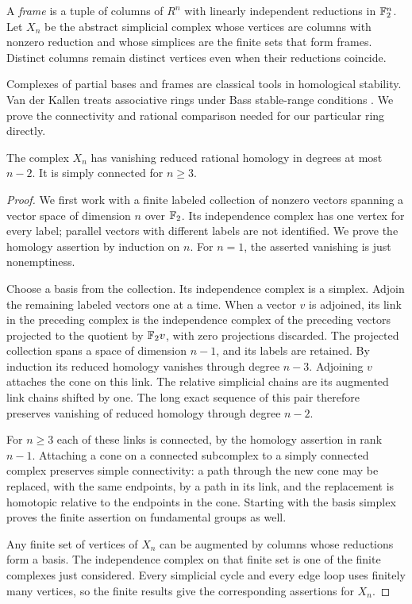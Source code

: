A \emph{frame} is a tuple of columns of $R^n$ with linearly independent
reductions in $\mathbb F_2^n$. Let $X_n$ be the abstract simplicial complex whose
vertices are columns with nonzero reduction and whose simplices are the
finite sets that form frames. Distinct columns remain distinct vertices
even when their reductions coincide.

Complexes of partial bases and frames are classical tools in
homological stability. Van der Kallen treats associative rings under
Bass stable-range conditions \cite{vanderKallen1980Homology}. We prove
the connectivity and rational comparison needed for our particular
ring directly.

\begin{lemma}\label{st:frames}
The complex $X_n$ has vanishing reduced rational homology in degrees at
most $n-2$. It is simply connected for $n\geq3$.
\end{lemma}

\begin{proof}
We first work with a finite labeled collection of nonzero vectors
spanning a vector space of dimension $n$ over $\mathbb F_2$. Its independence
complex has one vertex for every label; parallel vectors with different
labels are not identified. We prove the homology assertion by induction
on $n$. For $n=1$, the asserted vanishing is just nonemptiness.

Choose a basis from the collection. Its independence complex is a
simplex. Adjoin the remaining labeled vectors one at a time. When a
vector $v$ is adjoined, its link in the preceding complex is the
independence complex of the preceding vectors projected to the quotient
by $\mathbb F_2v$, with zero projections discarded. The projected collection
spans a space of dimension $n-1$, and its labels are retained.
By induction its reduced homology vanishes through degree $n-3$.
Adjoining $v$ attaches the cone on this link. The relative simplicial
chains are its augmented link chains shifted by one. The long exact
sequence of this pair therefore preserves vanishing of reduced homology
through degree $n-2$.

For $n\geq3$ each of these links is connected, by the homology assertion
in rank $n-1$. Attaching a cone on a connected subcomplex to a simply
connected complex preserves simple connectivity: a path through the
new cone may be replaced, with the same endpoints, by a path in its
link, and the replacement is homotopic relative to the endpoints in
the cone. Starting with the basis simplex proves the finite assertion
on fundamental groups as well.

Any finite set of vertices of $X_n$ can be augmented by columns whose
reductions form a basis. The independence complex on that finite set
is one of the finite complexes just considered. Every simplicial cycle
and every edge loop uses finitely many vertices, so the finite results
give the corresponding assertions for $X_n$.
\end{proof}

